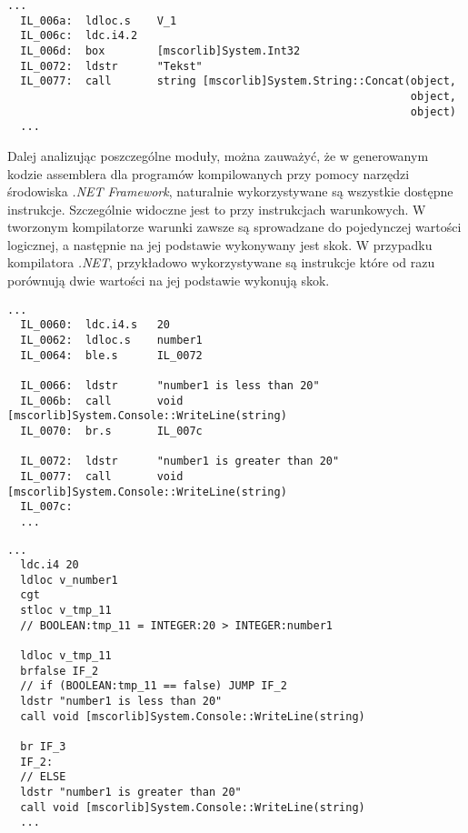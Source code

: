 \begin{lstlisting}[language=IL, caption={Fragment kodu deasemblerowanego testu programu C\#, przedstawiający łączenie łańcuchów znaków}, label=alg:asm]
  ...
  IL_006a:  ldloc.s    V_1
  IL_006c:  ldc.i4.2
  IL_006d:  box        [mscorlib]System.Int32
  IL_0072:  ldstr      "Tekst"
  IL_0077:  call       string [mscorlib]System.String::Concat(object,
                                                              object,
                                                              object)
  ...
\end{lstlisting}

\par Dalej analizując poszczególne moduły, można zauważyć, że w generowanym kodzie assemblera dla programów kompilowanych przy pomocy narzędzi środowiska \textit{.NET Framework}, naturalnie wykorzystywane są wszystkie dostępne instrukcje. Szczególnie widoczne jest to przy instrukcjach warunkowych. W tworzonym kompilatorze warunki zawsze są sprowadzane do pojedynczej wartości logicznej, a następnie na jej podstawie wykonywany jest skok. W przypadku kompilatora \textit{.NET}, przykładowo wykorzystywane są instrukcje które od razu porównują dwie wartości na jej podstawie wykonują skok.

\begin{lstlisting}[language=IL, caption={Fragment kodu deasemblerowanego testu programu C\#, przedstawiający instrukcje \texttt{if ... else}}, label=alg:asm]
  ...
  IL_0060:  ldc.i4.s   20
  IL_0062:  ldloc.s    number1
  IL_0064:  ble.s      IL_0072

  IL_0066:  ldstr      "number1 is less than 20"
  IL_006b:  call       void [mscorlib]System.Console::WriteLine(string)
  IL_0070:  br.s       IL_007c

  IL_0072:  ldstr      "number1 is greater than 20"
  IL_0077:  call       void [mscorlib]System.Console::WriteLine(string)
  IL_007c:  
  ...
\end{lstlisting}

\begin{lstlisting}[language=IL, caption={Fragment wygenerowanego kodu asemblerowanego z języka JavaScript, przedstawiający instrukcje \texttt{if ... else}}, label=alg:asm]
  ...
  ldc.i4 20
  ldloc v_number1
  cgt
  stloc v_tmp_11
  // BOOLEAN:tmp_11 = INTEGER:20 > INTEGER:number1
  
  ldloc v_tmp_11
  brfalse IF_2
  // if (BOOLEAN:tmp_11 == false) JUMP IF_2
  ldstr "number1 is less than 20"
  call void [mscorlib]System.Console::WriteLine(string)
  
  br IF_3
  IF_2: 
  // ELSE
  ldstr "number1 is greater than 20"
  call void [mscorlib]System.Console::WriteLine(string)
  ...
\end{lstlisting}

